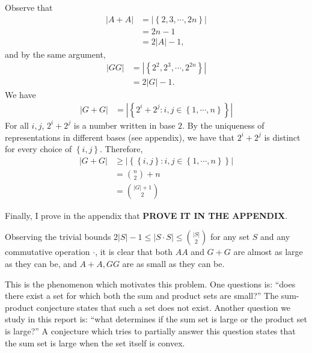 \documentclass[12pt]{amsart}
\begin{document}
Observe that
\begin{align*}
    \left\lvert A + A \right\rvert  & = \left\lvert \left\{2,3, \cdots ,2n \right\}  \right\rvert \\
    & = 2n - 1 \\
    & = 2 \left\lvert A \right\rvert - 1,
\end{align*}
and by the same argument,
\begin{align*}
    \left\lvert GG \right\rvert  & = \left\lvert \left\{2^{2}, 2^{3}, \cdots , 2^{2n} \right\} \right\rvert  \\
    & =2 \left\lvert G \right\rvert -1.
\end{align*}
We have
\begin{align*}
    \left\lvert G + G \right\rvert & = \left\lvert \left\{ 2^{i} + 2^{j} : i,j \in \left\{ 1, \cdots , n \right\} \right\} \right\rvert
\end{align*}
For all \(i,j\), \(2^{i} + 2^{j}\) is a number written in base \(2\). By the uniqueness of representations
in different bases (see appendix), we have that \(2^{i} + 2^{j}\) is distinct for every choice of \(\left\{ i,j \right\} \). Therefore,
\begin{align*}
    \left\lvert G + G \right\rvert & \geq  \left\lvert \left\{ \left\{ i,j \right\} : i,j \in \left\{ 1, \cdots , n \right\}  \right\}  \right\rvert \\
    & = \binom{n}{2} + n \\
    & = \binom{\left\lvert G \right\rvert + 1}{2} 
\end{align*}

Finally, I prove in the appendix that \textbf{PROVE IT IN THE APPENDIX}.

Observing the trivial bounds \( 2 \left\lvert S \right\rvert - 1 \leq \left\lvert S \cdot S \right\rvert \leq \binom{\left\lvert S \right\rvert }{2} \) for any set \(S\) and any
commutative operation \(\cdot \), it is clear that both \(AA\) and \(G +G\) are almost as large as they can be,
and \(A + A, GG \) are as small as they can be.

This is the phenomenon which motivates this problem.
One questions is: ``does there exist a set for which both the sum and product sets are small?''
The sum-product conjecture states that such a set does not exist. 
Another question we study in this report is: ``what
determines if the sum set is large or the product set is large?'' A
conjecture which tries to partially answer this question states that the sum set is large
when the set itself is convex.
\end{document}
